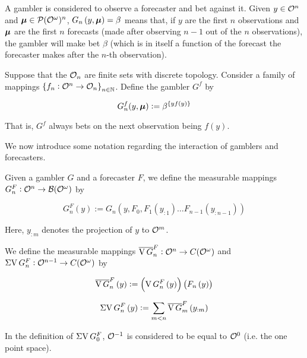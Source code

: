 A gambler is considered to observe a forecaster and bet against it. Given $y \in \mathcal{O}^n$ and $\bm{\mu} \in \mathcal{P}(\mathcal{O}^\omega)^n$, $G_n\left(y,\bm{\mu}\right)=\beta$ means that, if $y$ are the first $n$ observations and $\bm{\mu}$ are the first $n$ forecasts (made after observing $n-1$ out of the $n$ observations), the gambler will make bet $\beta$ (which is in itself a function of the forecast the forecaster makes after the $n$-th observation).

\begin{samepage}
\begin{example}

Suppose that the $\mathcal{O}_n$ are finite sets with discrete topology. Consider a family of mappings $\left\{f_n: \mathcal{O}^n \rightarrow \mathcal{O}_n\right\}_{n\in\mathbb{N}}$. Define the gambler $G^f$ by

\begin{equation}
G^f_n(y,\bm{\mu}):=\beta^{\{yf(y)\}}
\end{equation}

That is, $G^f$ always bets on the next observation being $f(y)$.

\end{example}
\end{samepage}

We now introduce some notation regarding the interaction of gamblers and forecasters. 

Given a gambler $G$ and a forecaster $F$, we define the measurable mappings $G^F_n: \mathcal{O}^n \rightarrow \mathcal{B}(\mathcal{O}^\omega)$ by

\begin{equation}
\label{eqn:GF}
G^F_n\left(y\right):=G_n\left(y,F_0,F_1\left(y_{:1}\right) \ldots F_{n-1}\left(y_{:n-1}\right)\right)
\end{equation}

Here, $y_{:m}$ denotes the projection of $y$ to $\mathcal{O}^m$.

We define the measurable mappings $\overline{\operatorname{V} G}^F_n: \mathcal{O}^n \rightarrow C(\mathcal{O}^\omega)$ and $\operatorname{\Sigma V} G^F_n: \mathcal{O}^{n-1} \rightarrow C(\mathcal{O}^\omega)$ by

\begin{equation}
\overline{\operatorname{V} G}^F_n\left(y\right):=\left(\operatorname{V} G^F_n\left(y\right)\right)\left(F_n\left(y\right)\right)
\end{equation}

\begin{equation}
\operatorname{\Sigma V} G^F_n\left(y\right) := \sum_{m < n} \overline{\operatorname{V} G}^F_m\left(y_{:m}\right)
\end{equation}

In the definition of $\operatorname{\Sigma V} G^F_0$, $\mathcal{O}^{-1}$ is considered to be equal to $\mathcal{O}^0$ (i.e. the one point space).

